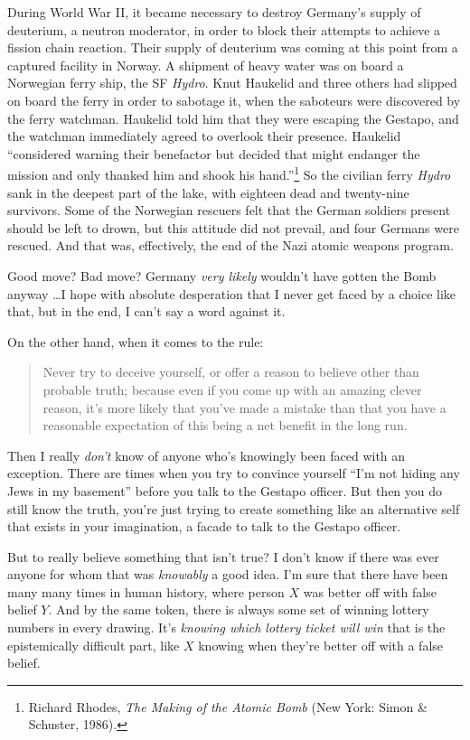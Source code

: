 {
 During World War II, it became necessary to destroy
Germany's supply of deuterium, a neutron moderator, in
order to block their attempts to achieve a fission chain reaction.
Their supply of deuterium was coming at this point from a captured
facility in Norway. A shipment of heavy water was on board a Norwegian
ferry ship, the SF \textit{Hydro}. Knut Haukelid and three others had
slipped on board the ferry in order to sabotage it, when the saboteurs
were discovered by the ferry watchman. Haukelid told him that they were
escaping the Gestapo, and the watchman immediately agreed to overlook
their presence. Haukelid ``considered warning their
benefactor but decided that might endanger the mission and only thanked
him and shook his hand.''\footnote{Richard Rhodes, \textit{The Making of the Atomic Bomb} (New
York: Simon \& Schuster, 1986).} So the
civilian ferry \textit{Hydro} sank in the deepest part of the lake,
with eighteen dead and twenty-nine survivors. Some of the Norwegian
rescuers felt that the German soldiers present should be left to drown,
but this attitude did not prevail, and four Germans were rescued. And
that was, effectively, the end of the Nazi atomic weapons program.}

{
 Good move? Bad move? Germany \textit{very likely}
wouldn't have gotten the Bomb anyway \ldots I hope with
absolute desperation that I never get faced by a choice like that, but
in the end, I can't say a word against it.}

{
 On the other hand, when it comes to the rule:}

\begin{quote}
{
 Never try to deceive yourself, or offer a reason to believe other
than probable truth; because even if you come up with an amazing clever
reason, it's more likely that you've
made a mistake than that you have a reasonable expectation of this
being a net benefit in the long run.}
\end{quote}

{
 Then I really \textit{don't} know of anyone
who's knowingly been faced with an exception. There are
times when you try to convince yourself
``I'm not hiding any Jews in my
basement'' before you talk to the Gestapo officer.
But then you do still know the truth, you're just
trying to create something like an alternative self that exists in your
imagination, a facade to talk to the Gestapo officer.}

{
 But to really believe something that isn't true? I
don't know if there was ever anyone for whom that was
\textit{knowably} a good idea. I'm sure that there have
been many many times in human history, where person $X$ was better off
with false belief $Y$. And by the same token, there is always some set of
winning lottery numbers in every drawing. It's
\textit{knowing which lottery ticket will win} that is the
epistemically difficult part, like $X$ knowing when
they're better off with a false belief.}

